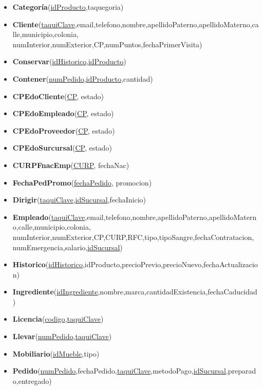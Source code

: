 \documentclass[11pt,letterpaper]{article}
\begin{document}
\begin{itemize}
\item \footnotesize{\textbf{Categoría}(\underline{idProducto},taquegoria)}
\item \footnotesize{\textbf{Cliente}(\underline{taquiClave},email,telefono,nombre,apellidoPaterno,apellidoMaterno,calle,municipio,colonia,
numInterior,numExterior,CP,numPuntos,fechaPrimerVisita)}
\item \footnotesize{\textbf{Conservar}(\underline{idHistorico},\underline{idProducto})}
\item \footnotesize{\textbf{Contener}(\underline{numPedido},\underline{idProducto},cantidad)}
\item {\footnotesize \textbf{CPEdoCliente}(\underline{CP}, estado)}
\item {\footnotesize \textbf{CPEdoEmpleado}(\underline{CP}, estado)} 
\item {\footnotesize \textbf{CPEdoProveedor}(\underline{CP}, estado) }
\item {\footnotesize \textbf{CPEdoSurcursal}(\underline{CP}, estado)}
\item{\footnotesize  \textbf{CURPFnacEmp}(\underline{CURP}, fechaNac) }
\item{\footnotesize  \textbf{FechaPedPromo}(\underline{fechaPedido}, promocion) }
\item \footnotesize{\textbf{Dirigir}(\underline{taquiClave},\underline{idSucursal},fechaInicio)}
\item \footnotesize{\textbf{Empleado}(\underline{taquiClave},email,telefono,nombre,apellidoPaterno,apellidoMaterno,calle,municipio,colonia,
numInterior,numExterior,CP,CURP,RFC,tipo,tipoSangre,fechaContratacion,
numEmergencia,salario,\underline{idSucursal})}
\item \footnotesize{\textbf{Historico}(\underline{idHistorico},idProducto,precioPrevio,precioNuevo,fechaActualizacion)}
\item \footnotesize{\textbf{Ingrediente}(\underline{idIngrediente},nombre,marca,cantidadExistencia,fechaCaducidad)}
\item \footnotesize{\textbf{Licencia}(\underline{codigo},\underline{taquiClave}})
\item \footnotesize{\textbf{Llevar}(\underline{numPedido},\underline{taquiClave})}
\item \footnotesize{\textbf{Mobiliario}(\underline{idMueble},tipo)}
\item \footnotesize{\textbf{Pedido}(\underline{numPedido},fechaPedido,\underline{taquiClave},metodoPago,\underline{idSucursal},preparado,entregado)}

\end{itemize}
\end{document}
